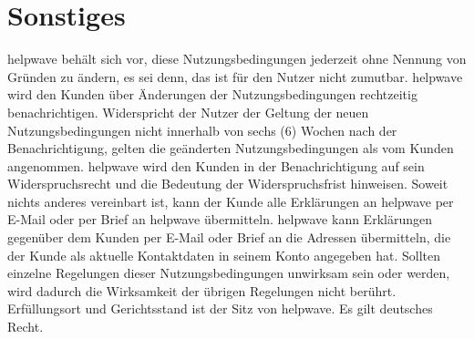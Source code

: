 \documentclass[10pt]{article}
\begin{document}
\section{Sonstiges}
helpwave behält sich vor, diese Nutzungsbedingungen jederzeit ohne Nennung von Gründen zu ändern, es sei denn, das ist
für den Nutzer nicht zumutbar. helpwave wird den Kunden über Änderungen der Nutzungsbedingungen rechtzeitig benachrichtigen. Widerspricht der Nutzer der Geltung der neuen Nutzungsbedingungen nicht innerhalb von sechs (6) Wochen nach
der Benachrichtigung, gelten die geänderten Nutzungsbedingungen als vom Kunden angenommen. helpwave wird den Kunden in der Benachrichtigung auf sein Widerspruchsrecht und die Bedeutung der Widerspruchsfrist hinweisen.
Soweit nichts anderes vereinbart ist, kann der Kunde alle Erklärungen an helpwave per E-Mail oder per Brief an helpwave
übermitteln. helpwave kann Erklärungen gegenüber dem Kunden per E-Mail oder Brief an die Adressen übermitteln, die der
Kunde als aktuelle Kontaktdaten in seinem Konto angegeben hat.
Sollten einzelne Regelungen dieser Nutzungsbedingungen unwirksam sein oder werden, wird dadurch die Wirksamkeit der
übrigen Regelungen nicht berührt. \\
Erfüllungsort und Gerichtsstand ist der Sitz von helpwave.
Es gilt deutsches Recht.
\end{document}
